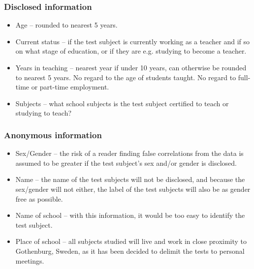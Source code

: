 \subsubsection*{Disclosed information}
    \begin{itemize} %
    \item Age – rounded to nearest 5 years.
    \item Current status – if the test subject is currently working as a teacher and if so on what stage of education, or if they are e.g. studying to become a teacher.
    \item Years in teaching – nearest year if under 10 years, can otherwise be rounded to nearest 5 years. No regard to the age of students taught. No regard to full-time or part-time employment.
    \item Subjects – what school subjects is the test subject certified to teach or studying to teach?
\end{itemize}

\subsubsection*{Anonymous information}
\begin{itemize} %
    \item Sex/Gender – the risk of a reader finding false correlations from the data is assumed to be greater if the test subject’s sex and/or gender is disclosed.
    \item Name – the name of the test subjects will not be disclosed, and because the sex/gender will not either, the label of the test subjects will also be as gender free as possible.
    \item Name of school – with this information, it would be too easy to identify the test subject.
    \item Place of school – all subjects studied will live and work in close proximity to Gothenburg, Sweden, as it has been decided to delimit the tests to personal meetings.
\end{itemize}